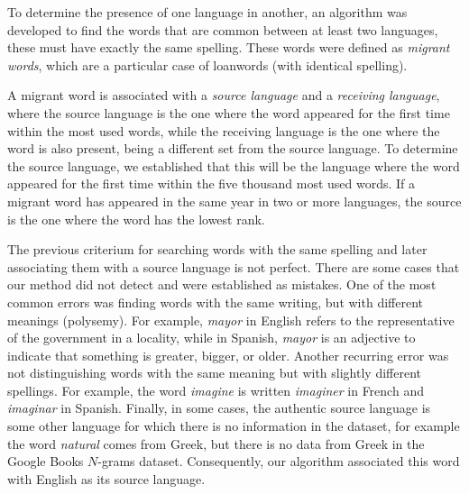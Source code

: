 \documentclass[10pt,letterpaper]{article} %
\begin{document}
To determine the presence of one language in another, an algorithm was
developed to find the words that are common between at least two languages,
these must have exactly the same spelling. These words were defined
as \textit{migrant words}, which are a particular case of loanwords (with identical spelling).

A migrant word is associated with a \textit{source language} and a
\textit{receiving language}, where the source language is the one where the
word appeared for the first time within the most used words,
while the receiving language is the one where the word is also present, being a
different set from the source language. 
To determine the source language, we established that this will be the language
where the word appeared for the first time within the five thousand most used
words. If a migrant word has appeared in the same year in two or
more languages, the source is the one where the word has the lowest rank.


The previous criterium for searching words with the same spelling and later
associating them with a source language is not perfect. There are some cases
that our method did not detect and were established as mistakes. One of the
most common errors was finding words with the same writing, but with different
meanings (polysemy). For example,  \textit{mayor} in English refers to the representative
of the government in a locality, while in Spanish, \textit{mayor} is an
adjective to indicate that something is greater, bigger, or older.  Another recurring
error was not distinguishing words with the same meaning but with slightly different spellings. For example, the word \textit{imagine} is written \textit{imaginer} in
French and \textit{imaginar} in Spanish.  Finally, in some cases, the authentic
source language is some other language for which there is no information in the
dataset, for example the word \textit{natural} comes from Greek, but there is no data
from Greek in the Google Books $N$-grams dataset. Consequently, our algorithm associated this word with English as its source language.
\end{document}
